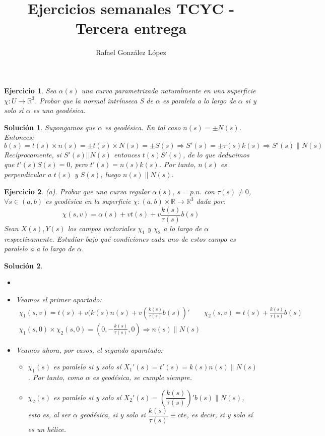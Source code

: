 \documentclass{article}
\theoremstyle{plain}
\newtheorem{exercise}{Ejercicio}
\newtheorem*{sol*}{Solución}
\newcommand{\R}{\mathbb{R}}
\newcommand{\X}{\chi}
\begin{document}
\title{Ejercicios semanales TCYC - Tercera entrega }
\author{Rafael González López}
\maketitle
\begin{exercise} Sea $\alpha(s)$ una curva parametrizada naturalmente en una superficie $\chi : U \rightarrow \R^3$. Probar
que la normal intrínseca S de $\alpha$ es paralela a lo largo de $\alpha$ si y solo si $\alpha$ es una geodésica.
\end{exercise}
\begin{sol*}
Supongamos que $\alpha$ es geodésica. En tal caso $n(s)=\pm N(s)$. Entonces:
\[
b(s) = t(s)\times n(s)= \pm t(s)\times N(s) = \pm S(s) \Rightarrow S'(s) = \pm \tau(s)k(s) \Rightarrow S'(s) \parallel N(s)
\]
Recíprocamente, si $S'(s)||N(s)$ entonces $t(s)S'(s)$, de lo que deducimos que $t'(s)S(s)=0$, pero $t'(s) = n(s)k(s)$. Por tanto, $n(s)$ es perpendicular a $t(s)$ y $S(s)$, luego $n(s)\parallel N(s)$.
\end{sol*}


\newpage
\begin{exercise}(a). Probar que una curva regular $\alpha(s)$, $s=p.n.$ con $\tau(s)\neq 0$, $\forall s\in (a,b)$ es geodésica en la superficie $\X:(a,b)\times\R \rightarrow\R^3$ dada por:
\[
\X(s,v)=\alpha(s)+v t(s) + v\frac{k(s)}{\tau(s)}b(s)
\]
Sean $X(s),Y(s)$ los campos vectoriales $\X_1$ y $\X_2$ a lo largo de $\alpha$ respectivamente. Estudiar bajo qué condiciones cada uno de estos campo es paralelo a a lo largo de $\alpha$.
\end{exercise}
\begin{sol*}
\begin{itemize}
\item[]
\item Veamos el primer apartado:
\begin{gather*}
\chi_1(s,v) = t(s) +v(k(s)n(s)+v\left(\frac{k(s)}{\tau(s)}b(s)\right)' \qquad \chi_2(s,v) = t(s)+\frac{k(s)}{\tau(s)}b(s)\\
\X_1(s,0)\times\X_2(s,0) = \left(0,-\frac{k(s)}{\tau(s)},0\right) \Rightarrow n(s) \parallel N(s)
\end{gather*}
\item Veamos ahora, por casos, el segundo aparatado:
\begin{itemize}
\item $\chi_1(s)$ es paralelo si y solo sí $X_1'(s) = t'(s) = k(s)n(s) \parallel N(s)$. Por tanto, como $\alpha$ es geodésica, se cumple siempre.
\item $\chi_2(s)$ es paralelo si y solo sí $X_2'(s) = \left(\dfrac{k(s)}{\tau(s)}\right)'b(s)\parallel N(s)$, esto es, al ser $\alpha$ geodésica, si y solo si $\dfrac{k(s)}{\tau(s)}\equiv cte$, es decir, si y solo sí es un hélice.
\end{itemize}
\end{itemize}
\end{sol*}
\end{document}
